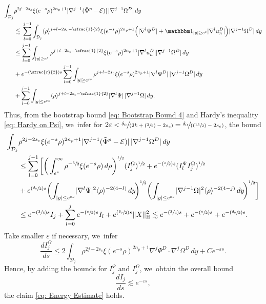 \documentclass[10pt]{amsart}
\newcommand{\Psfrac}[2]{(\sfrac{#1}{#2})}
\newcommand{\spfrac}[2]{\sfrac{#1}{(#2)}}
\theoremstyle{plain}
\theoremstyle{definition}
\begin{document}
\[
\begin{aligned}
\int_{\mathcal D_j} &\rho^{2j-2s_c}\xi(e^{-s}\rho)^{2n_p+1}|\nabla^{j-1}(\tilde \Psi^p-\mathcal E)|\,|\nabla^{j-1}\Omega^D|\,dy\\
&\lesssim\,\sum_{l=0}^{j-1}\int_{\mathcal D_j} \langle\rho\rangle^{j+l-2s_c-\sfrac{1}{2}}\xi(e^{-s}\rho)^{2n_p+1}\Big(|\nabla^l\Psi^D|+\mathbbm 1_{|y|\ge e^s}|\nabla^l u_n^D|\Big)|\nabla^{j-1}\Omega^D|\,dy\\
&\le  \sum_{l=0}^{j-1}\int_{|y|\ge e^s} \rho^{j+l-2s_c-\sfrac{1}{2}}\xi(e^{-s}\rho)^{2n_p+1}|\nabla^lu_n^D||\nabla^{j-1}\Omega^D|\,dy\\
&+e^{-\Psfrac{\varepsilon}{2} s}\sum_{l=0}^{j-1}\int_{|y|\ge e^{\varepsilon s}} \rho^{j+l-2s_c}\xi(e^{-s}\rho)^{2n_p+1}|\nabla^l \Psi^D |\,|\nabla^{j-1}\Omega^D|\,dy\\
&+\sum_{l=0}^{j-1}\int_{|y|\le e^{\varepsilon s}} \langle\rho\rangle^{j+l-2s_c-\sfrac{1}{2}}|\nabla^l\Psi |\,|\nabla^{j-1}\Omega|\,dy.
\end{aligned}
\]
Thus, from the bootstrap bound \eqref{eq: Bootstrap Bound 4} and Hardy's inequality \eqref{eq: Hardy on Psi}, we~infer for $2\varepsilon<\spfrac{\delta_0}{2k+\Psfrac32-2s_c}=\spfrac{\delta_0}{\Psfrac{15}{2}-2s_c}$, the bound
\[
\begin{aligned}
\int_{\mathcal D_j}& \rho^{2j-2s_c}\xi(e^{-s}\rho)^{2n_p+1}|\nabla^{j-1}(\tilde \Psi^p-\mathcal E)|\,|\nabla^{j-1}\Omega^D|\,dy\\
&\le \sum_{l=0}^{j-1}\bigg[\bigg(\int_{e^s}^\infty \rho^{-\sfrac52}\xi(e^{-s}\rho)\,d\rho\bigg)^{\sfrac{1}{2}}(I_j^\Omega)^{\sfrac12}+e^{-\Psfrac{\varepsilon}{2} s}(I_l^\Psi I_j^\Omega)^{\sfrac{1}{2}}\\
&+e^{\Psfrac{\delta_0}{2} s}\bigg(\!\int_{|y|\le e^{\varepsilon s}}\!|\nabla^l \Psi |^2\langle\rho\rangle^{-2(4-l)}\,dy\!\bigg)^{\sfrac{1}{2}}\bigg(\!\int_{|y|\le e^{\varepsilon s}}\! |\nabla^{j-1}\Omega|^2\langle\rho\rangle^{-2(4-j)}\,dy\!\bigg)^{\sfrac{1}{2}}\bigg]\\
&\le e^{-\Psfrac34 s}I_j+\sum_{l=0}^j e^{-\Psfrac{\varepsilon}{2} s} I_l+e^{\Psfrac{\delta_0}{2}s}\Vert X\Vert_{\mathbb H}^2\lesssim e^{-\Psfrac34 s}+ e^{-\Psfrac{\varepsilon}{2} s}+e^{-\Psfrac{\delta_0}{2}s}.
\end{aligned}
\]
Take smaller $\varepsilon$ if necessary, we~infer
\[
\frac{dI_j^\Omega}{ds}\le 2\int_{\mathcal D_j} \rho^{2j-2s_c}\xi(e^{-s}\rho)^{2n_p+1}\nabla^j\Psi^D\cdot\nabla^j\Omega^D\,dy+C e^{-\varepsilon s}.
\]
Hence, by adding the bounds for $I_j^\Psi$ and $I_j^\Omega$, we~obtain the overall bound
\begin{equation}
\label{eq: Case 1 Energy Estimate}
\frac{dI_j}{ds} \lesssim e^{-\varepsilon s},
\end{equation}
\ie the claim \eqref{eq: Energy Estimate} holds.
\end{document}
